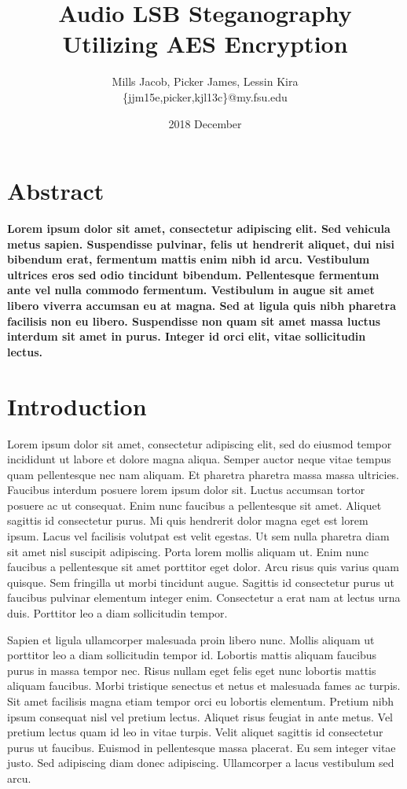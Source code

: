 \documentclass[a4paper,12pt]{article}
\title{Audio LSB Steganography Utilizing AES Encryption}
\date{2018 December}
\author{Mills Jacob, Picker James, Lessin Kira \\ \{jjm15e,picker,kjl13c\}@my.fsu.edu}
\begin{document}
\maketitle



\begin{multicols}{2}

\section*{Abstract}
\textbf{Lorem ipsum dolor sit amet, consectetur adipiscing elit. Sed vehicula metus sapien. Suspendisse pulvinar, felis ut hendrerit aliquet, dui nisi bibendum erat, fermentum mattis enim nibh id arcu. Vestibulum ultrices eros sed odio tincidunt bibendum. Pellentesque fermentum ante vel nulla commodo fermentum. Vestibulum in augue sit amet libero viverra accumsan eu at magna. Sed at ligula quis nibh pharetra facilisis non eu libero. Suspendisse non quam sit amet massa luctus interdum sit amet in purus. Integer id orci elit, vitae sollicitudin lectus.}

\section{Introduction}
Lorem ipsum dolor sit amet, consectetur adipiscing elit, sed do eiusmod tempor incididunt ut labore et dolore magna aliqua. Semper auctor neque vitae tempus quam pellentesque nec nam aliquam. Et pharetra pharetra massa massa ultricies. Faucibus interdum posuere lorem ipsum dolor sit. Luctus accumsan tortor posuere ac ut consequat. Enim nunc faucibus a pellentesque sit amet. Aliquet sagittis id consectetur purus. Mi quis hendrerit dolor magna eget est lorem ipsum. Lacus vel facilisis volutpat est velit egestas. Ut sem nulla pharetra diam sit amet nisl suscipit adipiscing. Porta lorem mollis aliquam ut. Enim nunc faucibus a pellentesque sit amet porttitor eget dolor. Arcu risus quis varius quam quisque. Sem fringilla ut morbi tincidunt augue. Sagittis id consectetur purus ut faucibus pulvinar elementum integer enim. Consectetur a erat nam at lectus urna duis. Porttitor leo a diam sollicitudin tempor.

Sapien et ligula ullamcorper malesuada proin libero nunc. Mollis aliquam ut porttitor leo a diam sollicitudin tempor id. Lobortis mattis aliquam faucibus purus in massa tempor nec. Risus nullam eget felis eget nunc lobortis mattis aliquam faucibus. Morbi tristique senectus et netus et malesuada fames ac turpis. Sit amet facilisis magna etiam tempor orci eu lobortis elementum. Pretium nibh ipsum consequat nisl vel pretium lectus. Aliquet risus feugiat in ante metus. Vel pretium lectus quam id leo in vitae turpis. Velit aliquet sagittis id consectetur purus ut faucibus. Euismod in pellentesque massa placerat. Eu sem integer vitae justo. Sed adipiscing diam donec adipiscing. Ullamcorper a lacus vestibulum sed arcu.


\end{multicols}
\end{document}
